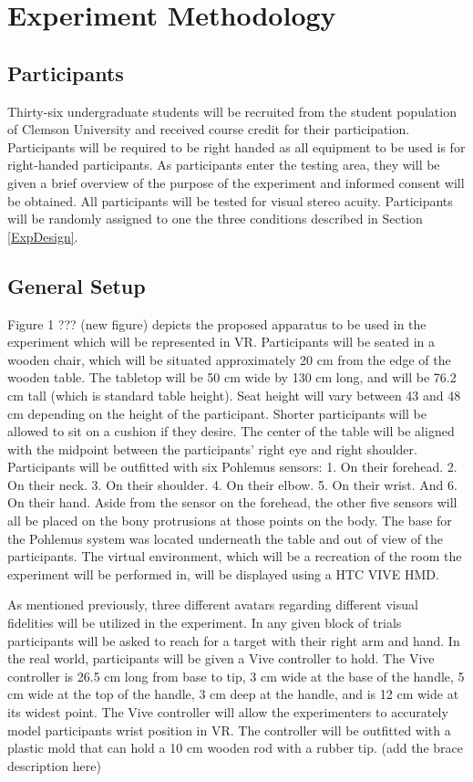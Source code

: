 \section{Experiment Methodology}

\subsection{Participants}
Thirty-six undergraduate students will be recruited from the student population of Clemson University and received course credit for their participation. Participants will be required to be right handed as all equipment to be used is for right-handed participants. As participants enter the testing area, they will be given a brief overview of the purpose of the experiment and informed consent will be obtained. All participants will be tested for visual stereo acuity. Participants will be randomly assigned to one the three conditions described in Section \ref{ExpDesign}. 

\subsection{General Setup}
Figure 1 ??? (new figure) depicts the proposed apparatus to be used in the experiment which will be represented in VR. Participants will be seated in a wooden chair, which will be situated approximately 20 cm from the edge of the wooden table. The tabletop will be 50 cm wide by 130 cm long, and will be 76.2 cm tall (which is standard table height). Seat height will vary between 43 and 48 cm depending on the height of the participant. Shorter participants will be allowed to sit on a cushion if they desire. The center of the table will be aligned with the midpoint between the participants’ right eye and right shoulder. Participants will be outfitted with six Pohlemus sensors: 1. On their forehead. 2. On their neck. 3. On their shoulder. 4. On their elbow. 5. On their wrist. And 6. On their hand. Aside from the sensor on the forehead, the other five sensors will all be placed on the bony protrusions at those points on the body. The base for the Pohlemus system was located underneath the table and out of view of the participants. The virtual environment, which will be a recreation of the room the experiment will be performed in, will be displayed using a HTC VIVE HMD.

As mentioned previously, three different avatars regarding different visual fidelities will be utilized in the experiment. In any given block of trials participants will be asked to reach for a target with their right arm and hand. In the real world, participants will be given a Vive controller to hold. The Vive controller is 26.5 cm long from base to tip, 3 cm wide at the base of the handle, 5 cm wide at the top of the handle, 3 cm deep at the handle, and is 12 cm wide at its widest point. The Vive controller will allow the experimenters to accurately model participants wrist position in VR. The controller will be outfitted with a plastic mold that can hold a 10 cm wooden rod with a rubber tip. (add the brace description here)


